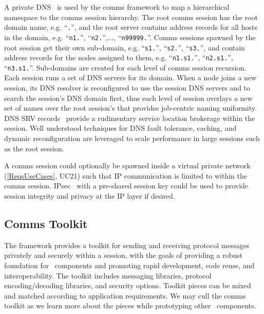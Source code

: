 \ifcomments
{}
\fi
A private DNS~\cite{rfc1034} is used by the comms framework to
map a hierarchical namespace to the comms session hierarchy.
The root comms session has the root domain name, e.g. ``{\tt \ngrm.}'',
and the root server contains address records for all hosts in the domain, e.g.
``{\tt n1.\ngrm}'', ``{\tt n2.\ngrm}'',..., ``{\tt n99999.\ngrm}''.
Comms sessions spawned by the root session get their own sub-domain, e.g.
``{\tt s1.\ngrm}'', ``{\tt s2.\ngrm}'', ``{\tt s3.\ngrm}'',
and contain address records for the nodes assigned to them, e.g.
``{\tt n1.s1.\ngrm}'', ``{\tt n2.s1.\ngrm}'', ``{\tt n3.s1.\ngrm}''.
Sub-domains are created for each level of comms session recursion.
Each session runs a set of DNS servers for its domain.
When a node joins a new session, its DNS resolver is reconfigured to use
the session DNS servers and to search the session's DNS domain first,
thus each level of session overlays a new set of names over
the root session's that provides job-centric naming uniformity.
DNS SRV records~\cite{rfc2782} provide a rudimentary service location
brokerage within the session.
Well understood techniques for DNS fault tolerance,
caching, and dynamic reconfiguration are leveraged to scale performance
in large sessions such as the root session.

A comms session could optionally be spawned inside a virtual private
network (\ref{ReqsUseCases}, UC21) such that IP communication
is limited to within the comms session.  IPsec~\cite{rfc2401} with
a pre-shared session key could be used to provide session integrity and
privacy at the IP layer if desired.

\subsection{Comms Toolkit}

The framework provides a toolkit for sending and receiving
protocol messages privately and securely within a session,
with the goals of providing a robust foundation for \ngrm\ components
and promoting rapid development, code reuse, and interoperability.
The toolkit includes messaging libraries,
protocol encoding/decoding libraries, and security options.
Toolkit pieces can be mixed and matched according to application
requirements.  We may cull the comms toolkit as we learn more
about the pieces while prototyping other \ngrm\ components.

